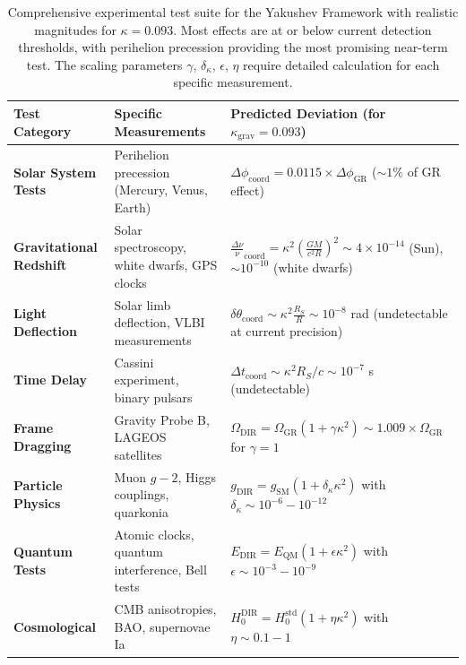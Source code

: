 \documentclass[11pt,a4paper]{article}
\begin{document}
	\begin{table}[htbp]
		\centering
		\scriptsize
		\begin{tabular}{p{}p{}p{}}
			\toprule
			\textbf{Test Category} & \textbf{Specific Measurements} & \textbf{Predicted Deviation (for $\kappa_{\text{grav}} = 0.093$)} \\
			\midrule
			\textbf{Solar System Tests} & 
			Perihelion precession (Mercury, Venus, Earth) &
			$\Delta\phi_{\text{coord}} = 0.0115 \times \Delta\phi_{\text{GR}}$ ($\sim 1\%$ of GR effect) \\
			\hline
			\textbf{Gravitational Redshift} &
			Solar spectroscopy, white dwarfs, GPS clocks &
			$\frac{\Delta\nu}{\nu}_{\text{coord}} = \kappa^2\left(\frac{GM}{c^2R}\right)^2 \sim 4\times10^{-14}$ (Sun), $\sim 10^{-10}$ (white dwarfs) \\
			\hline
			\textbf{Light Deflection} &
			Solar limb deflection, VLBI measurements &
			$\delta\theta_{\text{coord}} \sim \kappa^2 \frac{R_S}{R} \sim 10^{-8}$ rad (undetectable at current precision) \\
			\hline
			\textbf{Time Delay} &
			Cassini experiment, binary pulsars &
			$\Delta t_{\text{coord}} \sim \kappa^2 R_S/c \sim 10^{-7}$ s (undetectable) \\
			\hline
			\textbf{Frame Dragging} &
			Gravity Probe B, LAGEOS satellites &
			$\Omega_{\text{DIR}} = \Omega_{\text{GR}} (1 + \gamma \kappa^2) \sim 1.009 \times \Omega_{\text{GR}}$ for $\gamma=1$ \\
			\hline
			\textbf{Particle Physics} &
			Muon $g-2$, Higgs couplings, quarkonia &
			$g_{\text{DIR}} = g_{\text{SM}} (1 + \delta_\kappa \kappa^2)$ with $\delta_\kappa \sim 10^{-6} - 10^{-12}$ \\
			\hline
			\textbf{Quantum Tests} &
			Atomic clocks, quantum interference, Bell tests &
			$E_{\text{DIR}} = E_{\text{QM}} (1 + \epsilon \kappa^2)$ with $\epsilon \sim 10^{-3} - 10^{-9}$ \\
			\hline
			\textbf{Cosmological} &
			CMB anisotropies, BAO, supernovae Ia &
			$H_0^{\text{DIR}} = H_0^{\text{std}} (1 + \eta \kappa^2)$ with $\eta \sim 0.1 - 1$ \\
			\bottomrule
		\end{tabular}
		\caption{Comprehensive experimental test suite for the Yakushev Framework with realistic magnitudes for $\kappa = 0.093$. Most effects are at or below current detection thresholds, with perihelion precession providing the most promising near-term test. The scaling parameters $\gamma$, $\delta_\kappa$, $\epsilon$, $\eta$ require detailed calculation for each specific measurement.}
	\end{table}
	
\end{document}
